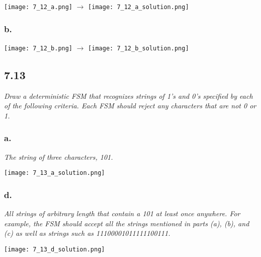 \documentclass[a4paper,man,natbib]{apa6}
\begin{document}
\begin{minipage}[c]{\linewidth}
	\centering
	\texttt{[image: 7\_12\_a.png]}
	$\rightarrow$
	\texttt{[image: 7\_12\_a\_solution.png]}
\end{minipage}
	
\subsubsection{b.}
\begin{minipage}[c]{\linewidth}
	\centering
	\texttt{[image: 7\_12\_b.png]}
	$\rightarrow$
	\texttt{[image: 7\_12\_b\_solution.png]}
\end{minipage}
\clearpage

\subsection{7.13}
\emph{Draw a deterministic FSM that recognizes strings of 1's and 0's specified by each of the following criteria. Each FSM should reject any characters that are not 0 or 1.}

\subsubsection{a.}
\emph{The string of three characters, 101.} \\
\begin{center} \texttt{[image: 7\_13\_a\_solution.png]} \\ \end{center}

\subsubsection{d.}
\emph{All strings of arbitrary length that contain a 101 at least once anywhere. For example, the FSM should accept all the strings mentioned in parts (a), (b), and (c) as well as strings such as 11100001011111100111.} \\
\begin{center} \texttt{[image: 7\_13\_d\_solution.png]} \\ \end{center}

\nocite{warford10}


\end{document}
